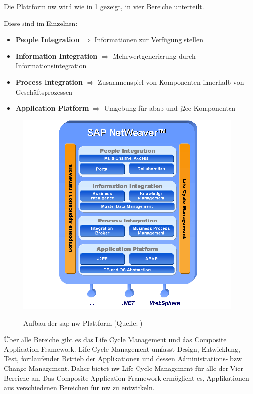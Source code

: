 Die Plattform \gls{nw} wird wie in \ref{abb:SAPNWGrundlagen} gezeigt, in vier Bereiche unterteilt.

Diese sind im Einzelnen:
\begin{itemize}
	\item \textbf{People Integration} $\Rightarrow$ Informationen zur Verfügung stellen
	\item \textbf{Information Integration} $\Rightarrow$ Mehrwertgenerierung durch Informationsintegration
	\item \textbf{Process Integration} $\Rightarrow$ Zusammenspiel von Komponenten innerhalb von Geschäftsprozessen
	\item \textbf{Application Platform} $\Rightarrow$ Umgebung für \gls{abap} und \gls{j2ee} Komponenten
\end{itemize}

\begin{figure}[H]
	\begin{center}
	\includegraphics[width=1\linewidth]{grafiken/NetWeaver.png}
	\vspace{-20pt}
	\caption{Aufbau der \gls{sap} \gls{nw} Plattform (Quelle: \cite{NWGrundlagen})}
	\vspace{-10pt}
	\label{abb:SAPNWGrundlagen}
	\end{center}
\end{figure}

Über alle Bereiche gibt es das Life Cycle Management und das Composite Application Framework. Life Cycle Management umfasst Design, Entwicklung, Test, fortlaufender Betrieb der Applikationen und dessen Administrations- \gls{bzw} Change-Management. Daher bietet \gls{nw} Life Cycle Management für alle der Vier Bereiche an.
Das Composite Application Framework ermöglicht es, Applikationen aus verschiedenen Bereichen für \gls{nw} zu entwickeln.

